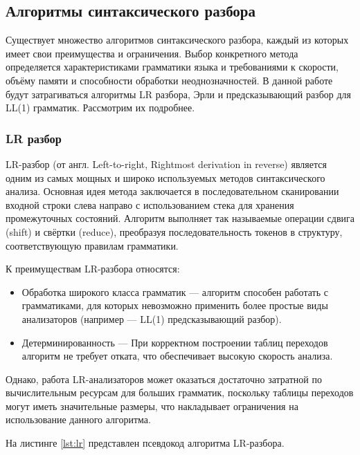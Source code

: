 \documentclass[14pt, russian]{scrartcl}
\begin{document}
\subsection{Алгоритмы синтаксического разбора}

Существует множество алгоритмов синтаксического разбора, каждый из которых имеет свои преимущества и ограничения.
Выбор конкретного метода определяется характеристиками грамматики языка и требованиями к скорости,
объёму памяти и способности обработки неоднозначностей. В данной работе будут затрагиваться алгоритмы LR разбора,
Эрли и предсказывающий разбор для LL(1) грамматик. Рассмотрим их подробнее.

\subsubsection{LR разбор}

LR-разбор (от англ. Left-to-right, Rightmost derivation in reverse) является одним из самых мощных и широко
используемых методов синтаксического анализа. Основная идея метода заключается в последовательном сканировании
входной строки слева направо с использованием стека для хранения промежуточных состояний. Алгоритм выполняет
так называемые операции сдвига (shift) и свёртки (reduce), преобразуя последовательность токенов в структуру,
соответствующую правилам грамматики.

К преимуществам LR-разбора относятся:

\begin{itemize}
	\item Обработка широкого класса грамматик --- алгоритм способен работать с грамматиками, для которых невозможно
	применить более простые виды анализаторов (например --- LL(1) предсказывающий разбор).
	\item Детерминированность --- При корректном построении таблиц переходов алгоритм не требует отката, что
	обеспечивает высокую скорость анализа.
\end{itemize}

Однако, работа LR-анализаторов может оказаться достаточно затратной по вычислительным ресурсам для больших грамматик,
поскольку таблицы переходов могут иметь значительные размеры, что накладывает ограничения на использование
данного алгоритма.

На листинге \ref{lst:lr} представлен псевдокод алгоритма LR-разбора.
\end{document}
